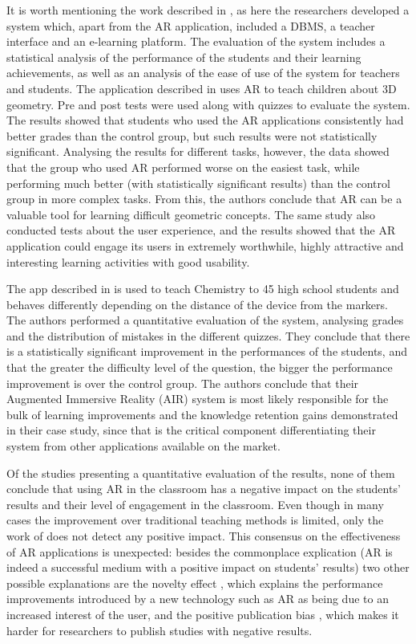 It is worth mentioning the work described in \cite{chang2018impacts}, as here the researchers developed a system which, apart from the AR application, included a \gls{DBMS}, a teacher interface and an e-learning platform. The evaluation of the system includes a statistical analysis of the performance of the students and their learning achievements, as well as an analysis of the ease of use of the system for teachers and students. The application described in \cite{thamrongrat2019design} uses AR to teach children about 3D geometry. Pre and post tests were used along with quizzes to evaluate the system. The results showed that students who used the AR applications consistently had better grades than the control group, but such results were not statistically significant. Analysing the results for different tasks, however, the data showed that the group who used AR performed worse on the easiest task, while performing much better (with statistically significant results) than the control group in more complex tasks. From this, the authors conclude that AR can be a valuable tool for learning difficult geometric concepts. The same study also conducted tests about the user experience, and the results showed that the AR application could engage its users in extremely worthwhile, highly attractive and interesting learning activities with good usability.


The app described in \cite{cen2019augmented} is used to teach Chemistry to 45 high school students and behaves differently depending on the distance of the device from the markers. The authors performed a quantitative evaluation of the system, analysing grades and the distribution of mistakes in the different quizzes. They conclude that there is a statistically significant improvement in the performances of the students, and that the greater the difficulty level of the question, the bigger the performance improvement is over the control group. The authors conclude that their Augmented Immersive Reality (AIR) system is most likely responsible for the bulk of learning improvements and the knowledge retention gains demonstrated in their case study, since that is the critical component differentiating their system from other applications available on the market.

Of the \papersWithEvaluation studies presenting a quantitative evaluation of the results, none of them conclude that using AR in the classroom has a negative impact on the students' results and their level of engagement in the classroom. Even though in many cases the improvement over traditional teaching methods is limited, only the work of \cite{carlos2020voluminis} does not detect any positive impact. This consensus on the effectiveness of AR applications is unexpected: besides the commonplace explication (AR is indeed a successful medium with a  positive impact on students' results) two other possible explanations are the novelty effect \cite{pisapia1993learning}, which explains the performance improvements introduced by a new technology such as AR as being due to an increased interest of the user, and the positive publication bias \cite{begg1994publication}, which makes it harder for researchers to publish studies with negative results.

